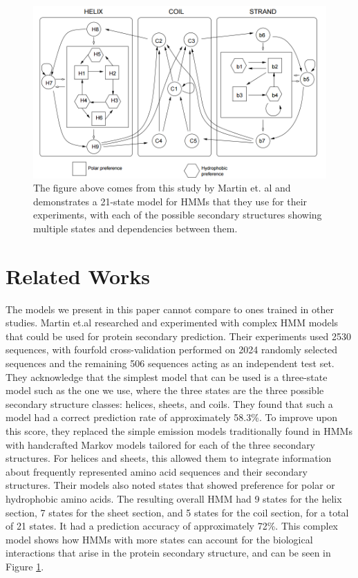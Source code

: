 \documentclass[11 pt, twocolumn]{article}
\begin{document}
\begin{figure}
\centering
\includegraphics[width = .4\textwidth]{ComplexHMMModel.png}
\caption{The figure above comes from this study \cite{Martin} by Martin et. al and demonstrates a 21-state model for HMMs that they use for their experiments, with each of the possible secondary structures showing multiple states and dependencies between them.}
\label{fig:compHMMMod}
\end{figure}

\section{Related Works}

The models we present in this paper cannot compare to ones trained in other studies. Martin et.al\cite{Martin} researched and experimented with complex HMM models that could be used for protein secondary prediction. Their experiments used 2530 sequences, with fourfold cross-validation performed on 2024 randomly selected sequences and the remaining 506 sequences acting as an independent test set. They acknowledge that the simplest model that can be used is a three-state model such as the one we use, where the three states are the three possible secondary structure classes: helices,
sheets, and coils. They found that such a model had a correct prediction rate of approximately 58.3\%. To improve upon this score, they replaced the simple emission models traditionally found in HMMs with handcrafted Markov models tailored for each of the three secondary structures. For helices and sheets, this allowed them to integrate information about frequently represented amino acid sequences and their secondary structures. Their models also noted states that showed preference for polar or hydrophobic amino acids. The resulting overall HMM had 9 states for the helix section, 7 states for the sheet section, and 5 states for the coil section, for a total of 21 states. It had a prediction accuracy of approximately 72\%\cite{Martin}. This complex model shows how HMMs with more states can account for the biological interactions that arise in the protein secondary structure, and can be seen in Figure \ref{fig:compHMMMod}. 
\end{document}

